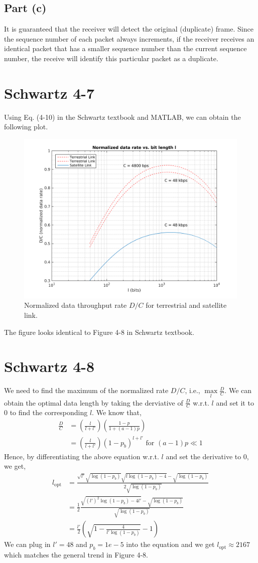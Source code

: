 \documentclass{article}
\begin{document}
	\subsection*{Part (c)}
		It is guaranteed that the receiver will detect the original (duplicate)
		frame. Since the sequence number of each packet always increments, if the
		receiver receives an identical packet that has a smaller sequence number
		than the current sequence number, the receive will identify this particular
		packet as a duplicate.

\section*{Schwartz 4-7}
	Using Eq. (4-10) in the Schwartz textbook and MATLAB, we can obtain the
	following plot.
	\begin{figure}[!hbt]
		\centering
		\includegraphics[width=0.6\linewidth]{hw5_3_dr.png}
		\caption{Normalized data throughput rate $D/C$ for terrestrial and satellite link.}
	\end{figure}
	The figure looks identical to Figure 4-8 in Schwartz textbook.

\section*{Schwartz 4-8}
	We need to find the maximum of the normalized rate $D/C$, i.e., $\max\limits_{l}\frac{D}{C}$.
	We can obtain the optimal data length by taking the derviative of $\frac{D}{C}$
	w.r.t. $l$ and set it to 0 to find the corresponding $l$. We know that,
	\begin{align*}
		\frac{D}{C} &= (\frac{l}{l+l'})(\frac{1-p}{1 + (a-1)p}) \\
		&= (\frac{l}{l+l'})(1-p_b)^{l+l'} \text{ for } (a-1)p \ll 1
	\end{align*}
	Hence, by differentiating the above equation w.r.t. $l$ and set the derivative
	to 0, we get,
	\begin{align*}
		l_{\text{opt}} &= \frac{\sqrt{l'} \sqrt{\log{(1-p_{b})}} \sqrt{l\log{(1-p_{b})} - 4} - \sqrt{\log{(1-p_{b})}}}{2 \sqrt{\log{(1-p_{b})}}} \\
		&= \frac{1}{2} \frac{\sqrt{(l')^{2} \log{(1-p_{b})} - 4l'} - \sqrt{\log{(1-p_{b})}}}{\sqrt{\log{(1-p_{b})}}} \\
		&= \frac{l'}{2} ( \sqrt{1 - \frac{4}{l' \log{(1-p_{b})}}} - 1)
	\end{align*}
	We can plug in $l' = 48$ and $p_{b} = 1e-5$ into the equation and we get
	$l_{\text{opt}} \approx 2167$ which matches the general trend in Figure 4-8.
\end{document}
